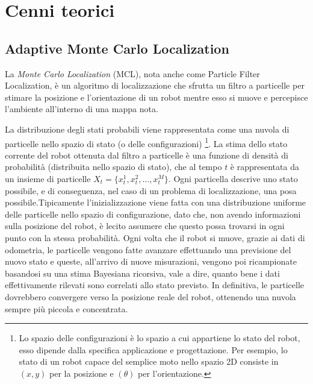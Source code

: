 
\chapter{Cenni teorici}
\label{appendice1}


\section{Adaptive Monte Carlo Localization}
\label{appendice1.1}

La \textit{Monte Carlo Localization} (MCL), nota anche come Particle Filter Localization, è un algoritmo di localizzazione che sfrutta un filtro a particelle per stimare la posizione e l'orientazione di un robot mentre esso si muove e percepisce l'ambiente all'interno di una mappa nota.



La distribuzione degli stati probabili viene rappresentata come una nuvola di particelle nello spazio di stato (o delle configurazioni) \footnote{Lo spazio delle configurazioni è lo spazio a cui appartiene lo stato del robot, esso dipende dalla specifica applicazione e progettazione. Per esempio, lo stato di un robot capace del semplice moto nello spazio 2D consiste in $(x, y)$ per la posizione e $(\theta)$ per l’orientazione.}.
La stima dello stato corrente del robot ottenuta dal filtro a particelle è una funzione di densità di probabilità (distribuita nello spazio di stato), che al tempo $t$ è rappresentata da un insieme di particelle $X_{t} = \{x_{t}^{1},x_{t}^{2},\dots,x_{t}^{M}\}$. 
Ogni particella descrive uno stato possibile, e di conseguenza, nel caso di un problema di localizzazione, una posa possibile.Tipicamente l’inizializzazione viene fatta con una distribuzione uniforme delle particelle nello spazio di configurazione, dato che, non avendo informazioni sulla posizione del robot, è lecito assumere che questo possa trovarsi in ogni punto con la stessa probabilità. Ogni volta che il robot si muove, grazie ai dati di odometria, le particelle vengono fatte avanzare effettuando una previsione del nuovo stato e queste, all'arrivo di nuove misurazioni, vengono poi ricampionate basandosi su una stima Bayesiana ricorsiva, vale a dire, quanto bene i dati effettivamente rilevati sono correlati allo stato previsto. In definitiva, le particelle dovrebbero convergere verso la posizione reale del robot, ottenendo una nuvola sempre più piccola e concentrata.

